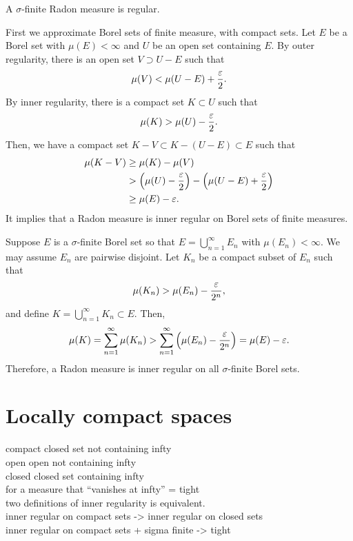 \documentclass{../../large}
\begin{document}
\begin{prop}
A $\sigma$-finite Radon measure is regular.
\end{prop}
\begin{pf}
First we approximate Borel sets of finite measure, with compact sets.
Let $E$ be a Borel set with $\mu(E)<\infty$ and $U$ be an open set containing $E$.
By outer regularity, there is an open set $V\supset U-E$ such that
\[\mu(V)<\mu(U-E)+\frac{\varepsilon}2.\]
By inner regularity, there is a compact set $K\subset U$ such that
\[\mu(K)>\mu(U)-\frac{\varepsilon}2.\]
Then, we have a compact set $K-V\subset K-(U-E)\subset E$ such that
\begin{align*}
\mu(K-V)&\ge\mu(K)-\mu(V)\\
&>\left(\mu(U)-\frac{\varepsilon}2\right)-\left(\mu(U-E)+\frac{\varepsilon}2\right)\\
&\ge\mu(E)-\varepsilon.
\end{align*}
It implies that a Radon measure is inner regular on Borel sets of finite measures.

Suppose $E$ is a $\sigma$-finite Borel set so that $E=\bigcup_{n=1}^\infty E_n$ with $\mu(E_n)<\infty$.
We may assume $E_n$ are pairwise disjoint.
Let $K_n$ be a compact subset of $E_n$ such that
\[\mu(K_n)>\mu(E_n)-\frac{\varepsilon}{2^n},\]
and define $K=\bigcup_{n=1}^\infty K_n\subset E$.
Then,
\[\mu(K)=\sum_{n=1}^\infty\mu(K_n)>\sum_{n=1}^\infty\left(\mu(E_n)-\frac{\varepsilon}{2^n}\right)=\mu(E)-\varepsilon.\]
Therefore, a Radon measure is inner regular on all $\sigma$-finite Borel sets.
\end{pf}


\section{Locally compact spaces}


compact  closed set not containing infty\\
open     open not containing infty\\
closed   closed set containing infty\\

for a measure that ``vanishes at infty'' = tight\\
two definitions of inner regularity is equivalent.\\

inner regular on compact sets -> inner regular on closed sets\\
inner regular on compact sets + sigma finite -> tight\\

\begin{prb}
\end{prb}
\end{document}
